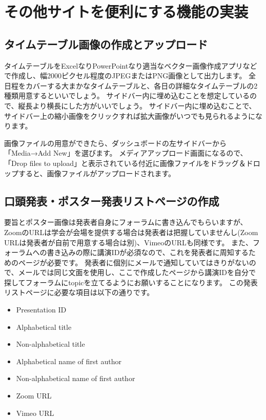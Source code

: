 \documentclass[titlepage,10pt,a4paper,uplatex]{jsbook}
\begin{document}
\section{その他サイトを便利にする機能の実装}

\subsection{タイムテーブル画像の作成とアップロード}

タイムテーブルをExcelなりPowerPointなり適当なベクター画像作成アプリなどで作成し、幅2000ピクセル程度のJPEGまたはPNG画像として出力します。
全日程をカバーする大まかなタイムテーブルと、各日の詳細なタイムテーブルの2種類用意するといいでしょう。
サイドバー内に埋め込むことを想定しているので、縦長より横長にした方がいいでしょう。
サイドバー内に埋め込むことで、サイドバー上の縮小画像をクリックすれば拡大画像がいつでも見られるようになります。

画像ファイルの用意ができたら、ダッシュボードの左サイドバーから「Media→Add New」を選びます。
メディアアップロード画面になるので、「Drop files to upload」と表示されている付近に画像ファイルをドラッグ＆ドロップすると、画像ファイルがアップロードされます。

\subsection{口頭発表・ポスター発表リストページの作成}

要旨とポスター画像は発表者自身にフォーラムに書き込んでもらいますが、ZoomのURLは学会が会場を提供する場合は発表者は把握していませんし(Zoom URLは発表者が自前で用意する場合は別)、VimeoのURLも同様です。
また、フォーラムへの書き込みの際に講演IDが必須なので、これを発表者に周知するためのページが必要です。
発表者に個別にメールで通知していてはきりがないので、メールでは同じ文面を使用し、ここで作成したページから講演IDを自分で探してフォーラムにtopicを立てるようにお願いすることになります。
この発表リストページに必要な項目は以下の通りです。

\begin{itemize}
\item Presentation ID
\item Alphabetical title
\item Non-alphabetical title
\item Alphabetical name of first author
\item Non-alphabetical name of first author
\item Zoom URL
\item Vimeo URL
\end{itemize}
\end{document}
